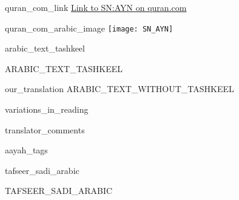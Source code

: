 \begin{comment}
The following strings are to be replaced by a script, in order to use this file as a template:-
* SN = sūrah number, without leading zeros
* AYN = āyah number, without leading zeros
* ARABIC_TEXT_TASHKEEL = the text of the aayah, with tashkeel marks
* ARABIC_TEXT_WITHOUT_TASHKEEL = the text of the aayah, without tashkeel marks
* TAFSEER_SADI_ARABIC = the tafseer of the aayah from as-sa'di
\end{comment}
\begin{comment}
The following tags are declared here:-
quran_com_link
quran_com_arabic_image
arabic_text_tashkeel
our_translation
variations_in_reading
translator_comments
aayah_tags
tafseer_sadi_arabic
tafseer_sadi_translation
license_comment_aayah
\end{comment}
\begin{taggedblock}{quran_com_link}
\href{http://quran.com/SN/AYN}{Link to SN:AYN on quran.com}
\end{taggedblock}
\begin{taggedblock}{quran_com_arabic_image}
\texttt{[image: SN\_AYN]}
\end{taggedblock}
\begin{taggedblock}{arabic_text_tashkeel}
\begin{Arabic}
ARABIC_TEXT_TASHKEEL
\end{Arabic}
\end{taggedblock}
\begin{taggedblock}{our_translation}
ARABIC_TEXT_WITHOUT_TASHKEEL
\end{taggedblock}
\begin{taggedblock}{variations_in_reading}
\end{taggedblock}
\begin{taggedblock}{translator_comments}
\end{taggedblock}
\begin{taggedblock}{aayah_tags}
\end{taggedblock}
\begin{taggedblock}{tafseer_sadi_arabic}
\begin{Arabic}
TAFSEER_SADI_ARABIC
\end{Arabic}
\end{taggedblock}
